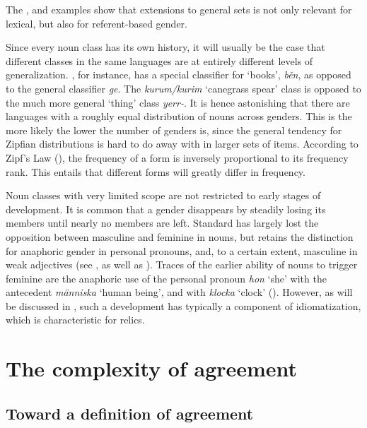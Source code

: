 \documentclass[output=collectionpaper]{langsci/langscibook}
\begin{document}
The ,  and  examples show that extensions to general sets is not only relevant for lexical, but also for referent-based gender.

Since every noun class has its own history, it will usually be the case that different classes in the same languages are at entirely different levels of generalization. , for instance, has a special classifier for `books', \textit{běn}, as opposed to the general classifier \textit{ge}. The  \textit{kurum/kurim} `canegrass spear' class is opposed to the much more general `thing' class \textit{yerr-}. It is hence astonishing that there are languages with a roughly equal distribution of nouns across genders. This is the more likely the lower the number of genders is, since the general tendency for Zipfian distributions is hard to do away with in larger sets of items. According to Zipf's Law (\citeyear*{Zipf1935}), the frequency of a form is inversely proportional to its frequency rank. This entails that different forms will greatly differ in frequency.

Noun classes with very limited scope are not restricted to early stages of development. It is common that a gender disappears by steadily losing its members until nearly no members are left. Standard  has largely lost the opposition between masculine and feminine in nouns, but retains the distinction for anaphoric gender in personal pronouns, and, to a certain extent, masculine in weak adjectives (see \citealt{Dahl2000}, as well as ). Traces of the earlier ability of nouns to trigger feminine are the anaphoric use of the personal pronoun \textit{hon} `she' with the antecedent \textit{människa} `human being', and with \textit{klocka} `clock' (\citealt[61]{Teleman1999}). However, as will be discussed in , such a development has typically a component of idiomatization, which is characteristic for relics.


\section{The complexity of agreement}
\label{sec:WDG:7}

  \subsection{Toward a definition of agreement}
\label{sec:WDG:7.1}
\end{document}

